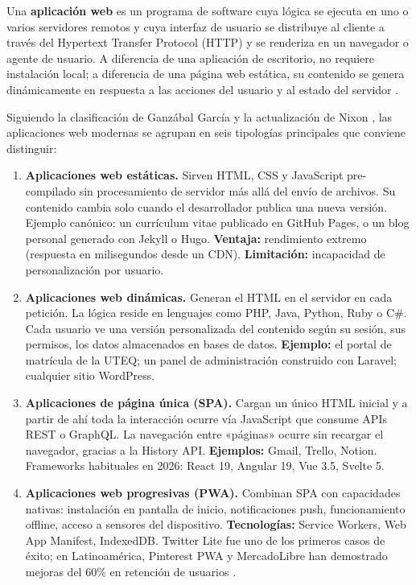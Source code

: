 Una \textbf{aplicación web} es un programa de software cuya lógica se
ejecuta en uno o varios servidores remotos y cuya interfaz de usuario
se distribuye al cliente a través del Hypertext Transfer Protocol
(HTTP) y se renderiza en un navegador o agente de usuario. A diferencia
de una aplicación de escritorio, no requiere instalación local; a
diferencia de una página web estática, su contenido se genera
dinámicamente en respuesta a las acciones del usuario y al estado del
servidor \cite{shklar2009web}.

Siguiendo la clasificación de Ganzábal García
\cite{deitel2017java} y la actualización de Nixon
\cite{nixon2021learning}, las aplicaciones web modernas se agrupan en
seis tipologías principales que conviene distinguir:

\begin{enumerate}
\item \textbf{Aplicaciones web estáticas.} Sirven HTML, CSS y
JavaScript pre-compilado sin procesamiento de servidor más allá del
envío de archivos. Su contenido cambia solo cuando el desarrollador
publica una nueva versión. Ejemplo canónico: un currículum vitae
publicado en GitHub Pages, o un blog personal generado con Jekyll o
Hugo. \textbf{Ventaja:} rendimiento extremo (respuesta en
milisegundos desde un CDN). \textbf{Limitación:} incapacidad de
personalización por usuario.

\item \textbf{Aplicaciones web dinámicas.} Generan el HTML en el
servidor en cada petición. La lógica reside en lenguajes como PHP,
Java, Python, Ruby o C\#. Cada usuario ve una versión personalizada
del contenido según su sesión, sus permisos, los datos almacenados en
bases de datos. \textbf{Ejemplo:} el portal de matrícula de la UTEQ;
un panel de administración construido con Laravel; cualquier sitio
WordPress.

\item \textbf{Aplicaciones de página única (SPA).} Cargan un único
HTML inicial y a partir de ahí toda la interacción ocurre vía
JavaScript que consume APIs REST o GraphQL. La navegación entre
«páginas» ocurre sin recargar el navegador, gracias a la History API.
\textbf{Ejemplos:} Gmail, Trello, Notion. Frameworks habituales en
2026: React 19, Angular 19, Vue 3.5, Svelte 5.

\item \textbf{Aplicaciones web progresivas (PWA).} Combinan SPA con
capacidades nativas: instalación en pantalla de inicio,
notificaciones push, funcionamiento offline, acceso a sensores del
dispositivo. \textbf{Tecnologías:} Service Workers, Web App Manifest,
IndexedDB. Twitter Lite fue uno de los primeros casos de éxito; en
Latinoamérica, Pinterest PWA y MercadoLibre han demostrado mejoras
del 60\% en retención de usuarios \cite{richards2020fundamentals}.


\end{enumerate}
